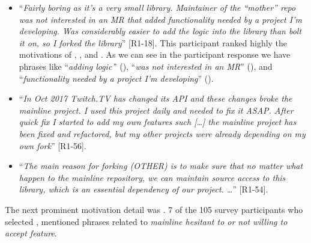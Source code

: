 \begin{itemize}[leftmargin=*]

\item ``\emph{Fairly boring as it's a very small library. Maintainer of the ``mother'' repo was not interested in an MR that added functionality needed by a project I'm developing. Was considerably easier to add the logic into the library than bolt it on, so I forked the library}'' [R1-18]. This participant ranked highly the motivations of , , and . As we can see in the participant response we have phrases like ``\textit{adding logic'}' (), ``\textit{was not interested in an MR}'' (), and ``\textit{functionality needed by a project I'm developing}'' ().

\item ``\emph{In Oct 2017 Twitch.TV has changed its API and these changes broke the mainline project. I used this project daily and needed to fix it ASAP. After quick fix I started to add my own features such [\ldots] the mainline project has been fixed and refactored, but my other projects were already depending on my own fork}'' [R1-56].

\item ``\emph{The main reason for forking (OTHER) is to make sure that no matter what happen to the mainline repository, we can maintain source access to this library, which is an essential dependency of our project. \ldots}'' [R1-54].

\end{itemize}

\nd The next prominent  motivation detail was .
7 of the 105 survey participants who selected , mentioned phrases related to \emph{mainline hesitant to or not willing to accept feature}.

